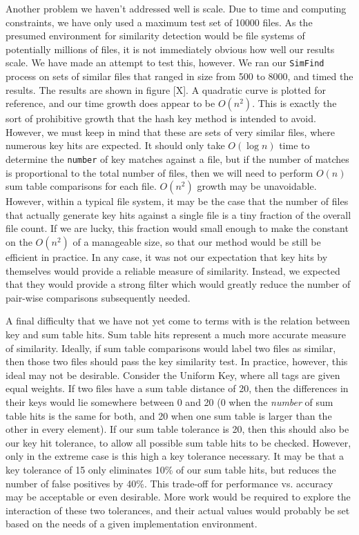 \documentclass[10pt, twocolumn]{article}
\begin{document}
Another problem we haven't addressed well is scale.  Due to time and computing constraints, we have only used a maximum test set of 10000 files.  As the presumed environment for similarity detection would be file systems of potentially millions of files, it is not immediately obvious how well our results scale.  We have made an attempt to test this, however.  We ran our {\tt SimFind} process on sets of similar files that ranged in size from 500 to 8000, and timed the results.  The results are shown in figure [X].  A quadratic curve is plotted for reference, and our time growth does appear to be $O(n^2)$.  This is exactly the sort of prohibitive growth that the hash key method is intended to avoid.  However, we must keep in mind that these are sets of very similar files, where numerous key hits are expected.  It should only take $O(\log n)$ time to determine the {\tt number} of key matches against a file, but if the number of matches is proportional to the total number of files, then we will need to perform $O(n)$ sum table comparisons for each file.  $O(n^2)$ growth may be unavoidable.  However, within a typical file system, it may be the case that the number of files that actually generate key hits against a single file is a tiny fraction of the overall file count.  If we are lucky, this fraction would small enough to make the constant on the $O(n^2)$ of a manageable size, so that our method would be still be efficient in practice.  In any case, it was not our expectation that key hits by themselves would provide a reliable measure of similarity.  Instead, we expected that they would provide a strong filter which would greatly reduce the number of pair-wise comparisons subsequently needed.

A final difficulty that we have not yet come to terms with is the relation between key and sum table hits.  Sum table hits represent a much more accurate measure of similarity.  Ideally, if sum table comparisons would label two files as similar, then those two files should pass the key similarity test.  In practice, however, this ideal may not be desirable.  Consider the Uniform Key, where all tags are given equal weights.  If two files have a sum table distance of 20, then the differences in their keys would lie somewhere between 0 and 20 (0 when the {\it number} of sum table hits is the same for both, and 20 when one sum table is larger than the other in every element).  If our sum table tolerance is 20, then this should also be our key hit tolerance, to allow all possible sum table hits to be checked.  However, only in the extreme case is this high a key tolerance necessary.  It may be that a key tolerance of 15 only eliminates 10\% of our sum table hits, but reduces the number of false positives by 40\%.  This trade-off for performance vs. accuracy may be acceptable or even desirable.  More work would be required to explore the interaction of these two tolerances, and their actual values would probably be set based on the needs of a given implementation environment.
\end{document}
